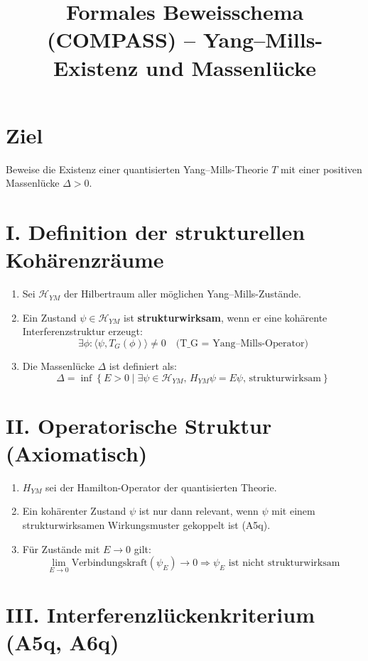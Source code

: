 \documentclass[12pt]{article}
\title{Formales Beweisschema (COMPASS) -- Yang--Mills-Existenz und Massenlücke}
\date{}
\begin{document}
\maketitle

\section*{Ziel}
Beweise die Existenz einer quantisierten Yang--Mills-Theorie $T$ mit einer positiven Massenlücke $\Delta > 0$.

\section*{I. Definition der strukturellen Kohärenzräume}

\begin{enumerate}
  \item Sei $\mathcal{H}_{YM}$ der Hilbertraum aller möglichen Yang--Mills-Zustände.
  \item Ein Zustand $\psi \in \mathcal{H}_{YM}$ ist \textbf{strukturwirksam}, wenn er eine kohärente Interferenzstruktur erzeugt:
  \[ \exists \phi : \langle \psi, T_G(\phi) \rangle \neq 0 \quad \text{(T\_G = Yang--Mills-Operator)} \]
  \item Die Massenlücke $\Delta$ ist definiert als:
  \[ \Delta = \inf \left\{ E > 0 \mid \exists \psi \in \mathcal{H}_{YM},\, H_{YM}\psi = E\psi,\, \text{strukturwirksam} \right\} \]
\end{enumerate}

\section*{II. Operatorische Struktur (Axiomatisch)}

\begin{enumerate}
  \item $H_{YM}$ sei der Hamilton-Operator der quantisierten Theorie.
  \item Ein kohärenter Zustand $\psi$ ist nur dann relevant, wenn $\psi$ mit einem strukturwirksamen Wirkungsmuster gekoppelt ist (A5q).
  \item Für Zustände mit $E \to 0$ gilt:
  \[ \lim_{E \to 0} \text{Verbindungskraft}(\psi_E) \to 0 \Rightarrow \psi_E \text{ ist nicht strukturwirksam} \]
\end{enumerate}

\section*{III. Interferenzlückenkriterium (A5q, A6q)}
\end{document}
